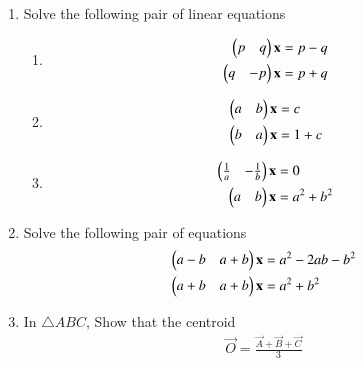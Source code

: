 \renewcommand{\theequation}{\theenumi}
\begin{enumerate}[label=\arabic*.,ref=\thesubsection.\theenumi]

\item Solve the following pair of linear equations
%
\begin{enumerate}[itemsep=2pt]
\item
\begin{align}
\begin{split}
\begin{pmatrix}p & q \end{pmatrix}\mathbf{x}&=p-q
\\
\begin{pmatrix}q & -p \end{pmatrix}\mathbf{x}&=p+q
\end{split}
\end{align}
\item
\begin{align}
\begin{split}
\begin{pmatrix}a & b \end{pmatrix}\mathbf{x}&=c
\\
\begin{pmatrix}b & a \end{pmatrix}\mathbf{x}&=1+c
\end{split}
\end{align}
\item
\begin{align}
\begin{split}
\begin{pmatrix}\frac{1}{a} & -\frac{1}{b} \end{pmatrix}\mathbf{x}&=0
\\
\begin{pmatrix}a & b \end{pmatrix}\mathbf{x}&=a^2+b^2
\end{split}
\end{align}
%
\end{enumerate}
\solution 

%
\item Solve the following pair of equations
\begin{align}
\begin{split}
\begin{pmatrix}a-b & a+b \end{pmatrix}\mathbf{x}&=a^2-2ab-b^2
\\
\begin{pmatrix}a+b & a+b \end{pmatrix}\mathbf{x}&=a^2+b^2
\end{split}
\end{align}
\solution 


\item In $\triangle ABC$, Show that the centroid 
\begin{align}
\vec{O} = \frac{\vec{A}+\vec{B}+\vec{C}}{3}
\end{align}
%
\\
\solution 



\end{enumerate}
